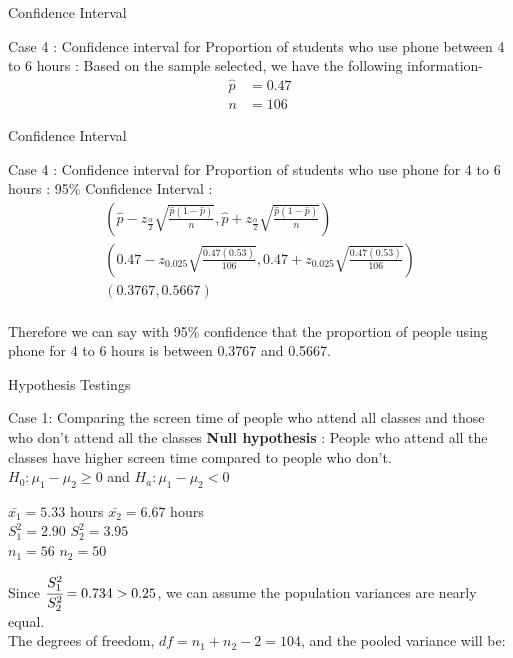 \documentclass{beamer}
\begin{document}
\begin{frame}{Confidence Interval}
\begin{block}{Case 4 :  Confidence interval for Proportion of students who use phone between 4 to 6 hours :}
Based on the sample selected, we have the following information-
\begin{align}
    \hat{p} &= 0.47\\
    n &= 106
\end{align}
\end{block}
\end{frame}
\begin{frame}{Confidence Interval}
\begin{block}{Case 4 :  Confidence interval for Proportion of students who use phone for 4 to 6 hours :}
95\% Confidence Interval :
 \begin{gather}
      \left(\hat{p}-z_{\frac{\alpha}{2}}\sqrt{\frac{\hat{p}(1-\hat{p})}{n}},\hat{p}+z_{\frac{\alpha}{2}}\sqrt{\frac{\hat{p}(1-\hat{p})}{n}}\right)
      \\\left(0.47-z_{0.025}\sqrt{\frac{0.47(0.53)}{106}},0.47+z_{0.025}\sqrt{\frac{0.47(0.53)}{106}}\right)
      \\(0.3767,0.5667)
 \end{gather}
 \newline
\\Therefore we can say with 95\% confidence that the proportion of people using phone for 4 to 6 hours is between 0.3767 and 0.5667.
\end{block}
\end{frame}









\begin{frame}{Hypothesis Testings}
\begin{block}{Case 1: Comparing the screen time of people who attend all classes and those who don't attend all the classes}
\textbf{Null hypothesis} : People who attend all the classes have higher screen time compared to people who don't.\\
  $ H_0 : \mu_1 - \mu_2 \geq 0$ and $H_a : \mu_1 - \mu_2 < 0$
\par
\begin{center}
    $\bar{x_1} = 5.33$ hours \quad $\bar{x_2} = 6.67$ hours \\
    $S^2_1 = 2.90$ \quad
    $S^2_2 = 3.95$ \\
    $n_1 = 56$ \quad
    $n_2 = 50$
\end{center}
Since $\cfrac{S_1^2}{S_2^2} = 0.734 > 0.25$, we can assume the population variances are nearly equal.\\
The degrees of freedom, $df = n_1 + n_2 -2 = 104$, and the pooled variance will be:
\end{block}
\end{frame}
\end{document}
